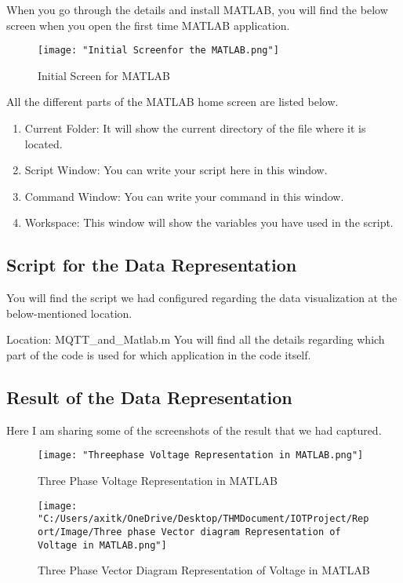 \documentclass{article}
\begin{document}
	When you go through the details and install MATLAB, you will find the below screen when you open the first time MATLAB application.
	
	\begin{figure}[h]
		\centering
		\texttt{[image: "Initial Screenfor the MATLAB.png"]}
		\caption{Initial Screen for MATLAB}
	\end{figure}
	
	All the different parts of the MATLAB home screen are listed below.
	\begin{enumerate}
		\item Current Folder: It will show the current directory of the file where it is located.
		\item Script Window: You can write your script here in this window.
		\item Command Window: You can write your command in this window.
		\item Workspace: This window will show the variables you have used in the script.
	\end{enumerate}
	
	\subsection{Script for the Data Representation}
	
	You will find the script we had configured regarding the data visualization at the below-mentioned location.
	
	Location: {MQTT_and_Matlab.m}
	You will find all the details regarding which part of the code is used for which application in the code itself.
	
	\subsection{Result of the Data Representation}
	
	Here I am sharing some of the screenshots of the result that we had captured.
	
	\begin{figure}[h]
		\centering
		\texttt{[image: "Threephase Voltage Representation in MATLAB.png"]}
		\caption{Three Phase Voltage Representation in MATLAB}
	\end{figure}
	
	\begin{figure}[h]
		\centering
		\texttt{[image: "C:/Users/axitk/OneDrive/Desktop/THMDocument/IOTProject/Report/Image/Three phase Vector diagram Representation of Voltage in MATLAB.png"]}
		\caption{Three Phase Vector Diagram Representation of Voltage in MATLAB}
	\end{figure}
	
\end{document}
